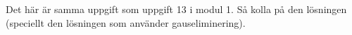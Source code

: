 \documentclass[../../main.tex]{subfiles}
\begin{document}
\begin{solution}{3}

Det här är samma uppgift som uppgift 13 i modul 1. Så kolla på den lösningen (speciellt den lösningen som använder gauseliminering).

\end{solution}
\end{document}
